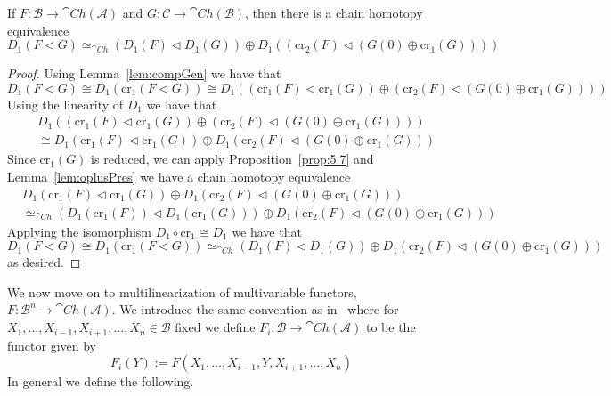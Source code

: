 \begin{prop}[label=prop:5.10]
    If $F:\mathcal{B}\to \cat{Ch}(\mathcal{A})$ and $G:\mathcal{C}\to \cat{Ch}(\mathcal{B})$, then there is a  chain homotopy equivalence
    \begin{equation*}
        D_1(F\lhd G)\simeq_{\cat{Ch}}(D_1(F)\lhd D_1(G))\oplus D_1((\text{cr}_2(F)\lhd (G(0)\oplus \text{cr}_1(G))))
    \end{equation*}
\end{prop}
\begin{proof}
    Using Lemma~\ref{lem:compGen} we have that 
    \begin{equation*}
        D_1(F\lhd G) \cong D_1(\text{cr}_1(F\lhd G)) \cong D_1((\text{cr}_1(F)\lhd \text{cr}_1(G))\oplus (\text{cr}_2(F)\lhd (G(0)\oplus \text{cr}_1(G))))
    \end{equation*}
    Using the linearity of $D_1$ we have that 
    \begin{align*}
        &D_1((\text{cr}_1(F)\lhd \text{cr}_1(G))\oplus (\text{cr}_2(F)\lhd (G(0)\oplus \text{cr}_1(G)))) \\
        &\cong D_1(\text{cr}_1(F)\lhd \text{cr}_1(G))\oplus D_1(\text{cr}_2(F)\lhd (G(0)\oplus \text{cr}_1(G)))
    \end{align*}
    Since $\text{cr}_1(G)$ is reduced, we can apply Proposition~\ref{prop:5.7} and Lemma~\ref{lem:oplusPres} we have a  chain homotopy equivalence
    \begin{align*}
        &D_1(\text{cr}_1(F)\lhd \text{cr}_1(G))\oplus D_1(\text{cr}_2(F)\lhd (G(0)\oplus \text{cr}_1(G))) \\
        &\simeq_{\cat{Ch}} (D_1(\text{cr}_1(F))\lhd D_1(\text{cr}_1(G)))\oplus D_1(\text{cr}_2(F)\lhd (G(0)\oplus \text{cr}_1(G)))
    \end{align*}
    Applying the isomorphism $D_1\circ \text{cr}_1 \cong D_1$ we have that 
    \begin{equation*}
        D_1(F\lhd G) \cong D_1(\text{cr}_1(F\lhd G)) \simeq_{\cat{Ch}} (D_1(F)\lhd D_1(G))\oplus D_1(\text{cr}_2(F)\lhd (G(0)\oplus \text{cr}_1(G)))
    \end{equation*}
    as desired.
\end{proof}


We now move on to multilinearization of multivariable functors, $F:\mathcal{B}^n\to \cat{Ch}(\mathcal{A})$. We introduce the same convention as in~\cite[Conv 5.11]{BJORT} where for $X_1,...,X_{i-1},X_{i+1},...,X_n \in \mathcal{B}$ fixed we define $F_i:\mathcal{B}\to \cat{Ch}(\mathcal{A})$ to be the functor given by 
\begin{equation*}
    F_i(Y) := F(X_1,...,X_{i-1},Y,X_{i+1},...,X_n)
\end{equation*}
In general we define the following.

